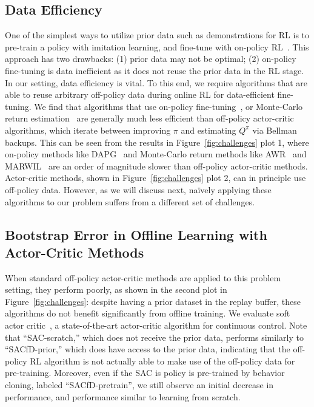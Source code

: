 \subsection{Data Efficiency} \label{sec:challenges_efficiency}
One of the simplest ways to utilize prior data such as demonstrations for RL is to pre-train a policy with imitation learning, and fine-tune with on-policy RL~\citep{gupta2019relay, rajeswaran2018dextrous}. This approach has two drawbacks: (1) prior data may not be optimal; (2) on-policy fine-tuning is data inefficient as it does not reuse the prior data in the RL stage. In our setting, data efficiency is vital. To this end, we require algorithms that are able to reuse arbitrary off-policy data during online RL for data-efficient fine-tuning. We find that algorithms that use on-policy fine-tuning~\citep{rajeswaran2018dextrous, gupta2019relay}, or Monte-Carlo return estimation~\citep{peters2007rwr, wang2018marwil, peng2019awr} are generally much less efficient than off-policy actor-critic algorithms, which iterate between improving $\pi$ and estimating $Q^\pi$ via Bellman backups. This can be seen from the results in Figure~\ref{fig:challenges} plot 1, where on-policy methods like DAPG~\citep{rajeswaran2018dextrous} and Monte-Carlo return methods like AWR~\citep{peng2019awr} and MARWIL~\citep{wang2018marwil} are an order of magnitude slower than off-policy actor-critic methods. Actor-critic methods, shown in Figure~\ref{fig:challenges} plot 2, can in principle use off-policy data. However, as we will discuss next, na\"{i}vely applying these algorithms to our problem suffers from a different set of challenges. 

\subsection{Bootstrap Error in Offline Learning with Actor-Critic Methods} \label{sec:challenges_sac}
When standard off-policy actor-critic methods are applied to this problem setting, they perform poorly, as shown in the second plot in Figure~\ref{fig:challenges}: despite having a prior dataset in the replay buffer, these algorithms do not benefit significantly from offline training.
We evaluate soft actor critic~\citep{haarnoja2018sac}, a state-of-the-art actor-critic algorithm for continuous control.
Note that ``SAC-scratch,'' which does not receive the prior data, performs similarly to ``SACfD-prior,'' which does have access to the prior data, indicating that the off-policy RL algorithm is not actually able to make use of the off-policy data for pre-training.
Moreover, even if the SAC is policy is pre-trained by behavior cloning, labeled ``SACfD-pretrain'', we still observe an initial decrease in performance, and performance similar to learning from scratch.

